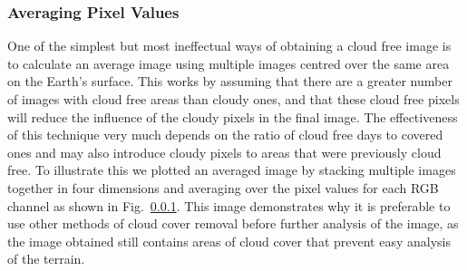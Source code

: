 \subsubsection{Averaging Pixel Values}
 One of the simplest but most ineffectual ways of obtaining a cloud free image is to calculate an average image using multiple images centred over the same area on the Earth's surface. This works by assuming that there are a greater number of images with cloud free areas than cloudy ones, and that these cloud free pixels will reduce the influence of the cloudy pixels in the final image. The effectiveness of this technique very much depends on the ratio of cloud free days to covered ones and may also introduce cloudy pixels to areas that were previously cloud free. To illustrate this we plotted an averaged image by stacking multiple images together in four dimensions and averaging over the pixel values for each RGB channel as shown in Fig.~\ref{}. This image demonstrates why it is preferable to use other methods of cloud cover removal before further analysis of the image, as the image obtained still contains areas of cloud cover that prevent easy analysis of the terrain.
